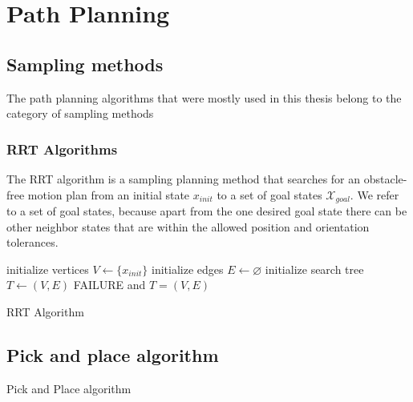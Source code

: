 \section{Path Planning}

\subsection{Sampling methods}

The path planning algorithms that were mostly used in this thesis belong to the category of sampling methods

\subsubsection{RRT Algorithms}

The RRT algorithm is a sampling planning method that searches for an obstacle-free motion plan from an initial state $x_{init}$ to a set of goal states $\mathcal{X}_{goal}$. We refer to a set of goal states, because
apart from the one desired goal state there can be other neighbor states that are within the allowed position and orientation tolerances.

\begin{algorithm}[H]
\SetAlgoLined
initialize vertices $V \leftarrow \lbrace x_{init} \rbrace$\;
initialize edges $E \leftarrow \varnothing$\;
initialize search tree $T \leftarrow (V,E)$\;
\Return FAILURE and $T=(V,E)$
\caption{RRT Algorithm}
\end{algorithm}


\subsection{Pick and place algorithm}

\begin{algorithm}[H]
\SetAlgoLined
{}
\caption{Pick and Place algorithm}
\end{algorithm}


